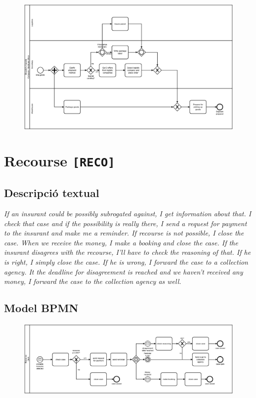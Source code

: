 \begin{figure}[!h]
    \centering
    \includegraphics[width=\textwidth]{figures/benchmark/Dispatch-of-goods.png}
\end{figure}

\clearpage

\section{Recourse \texttt{[RECO]}}

\subsection*{Descripció textual}

\textit{If an insurant could be possibly subrogated against, I get information about that. I check that case and if the possibility is really there, I send a request for payment to the insurant and make me a reminder. If recourse is not possible, I close the case. When we receive the money, I make a booking and close the case. If the insurant disagrees with the recourse, I’ll have to check the reasoning of that. If he is right, I simply close the case. If he is wrong, I forward the case to a collection agency. It the deadline for disagreement is reached and we haven’t received any money, I forward the case to the collection agency as well.}

\subsection*{Model BPMN}

\begin{figure}[!h]
    \centering
    \includegraphics[width=\textwidth]{figures/benchmark/Recourse.png}
\end{figure}

